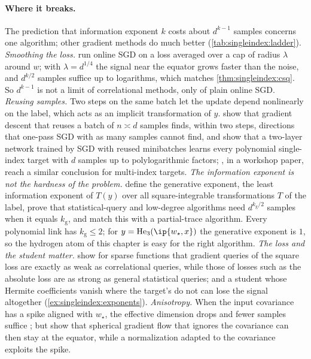 \begin{refsection}
\paragraph{Where it breaks.}
The prediction that information exponent $k$ costs about $d^{k-1}$ samples concerns one algorithm; other gradient methods do much better (\cref{tab:singleindex:ladder}). \emph{Smoothing the loss.} \Textcite{DamianEtAl2023} run online SGD on a loss averaged over a cap of radius $\lambda$ around $w$; with $\lambda=d^{1/4}$ the signal near the equator grows faster than the noise, and $d^{k/2}$ samples suffice up to logarithms, which matches \cref{thm:singleindex:csq}. So $d^{k-1}$ is not a limit of correlational methods, only of plain online SGD. \emph{Reusing samples.} Two steps on the same batch let the update depend nonlinearly on the label, which acts as an implicit transformation of $y$. \Textcite{DandiEtAl2024} show that gradient descent that reuses a batch of $n\asymp d$ samples finds, within two steps, directions that one-pass SGD with as many samples cannot find, and \textcite{LeeEtAl2024} show that a two-layer network trained by SGD with reused minibatches learns every polynomial single-index target with $d$ samples up to polylogarithmic factors; \textcite{ArnaboldiEtAl2024a}, in a workshop paper, reach a similar conclusion for multi-index targets. \emph{The information exponent is not the hardness of the problem.} \Textcite{DamianEtAl2024} define the generative exponent, the least information exponent of $T(y)$ over all square-integrable transformations $T$ of the label, prove that statistical-query and low-degree algorithms need $d^{k_{\mathrm g}/2}$ samples when it equals $k_{\mathrm g}$, and match this with a partial-trace algorithm. Every polynomial link has $k_{\mathrm g}\le2$; for $y=\He_3(\ip{w_\star,x})$ the generative exponent is $1$, so the hydrogen atom of this chapter is easy for the right algorithm. \emph{The loss and the student matter.} \Textcite{JoshiMisiakiewiczSrebro2024} show for sparse functions that gradient queries of the square loss are exactly as weak as correlational queries, while those of losses such as the absolute loss are as strong as general statistical queries; and a student whose Hermite coefficients vanish where the target's do not can lose the signal altogether (\cref{ex:singleindex:exponents}). \emph{Anisotropy.} When the input covariance has a spike aligned with $w_\star$, the effective dimension drops and fewer samples suffice \parencite{BaEtAl2023}; but \textcite{MousaviHosseiniEtAl2023} show that spherical gradient flow that ignores the covariance can then stay at the equator, while a normalization adapted to the covariance exploits the spike.


\end{refsection}
